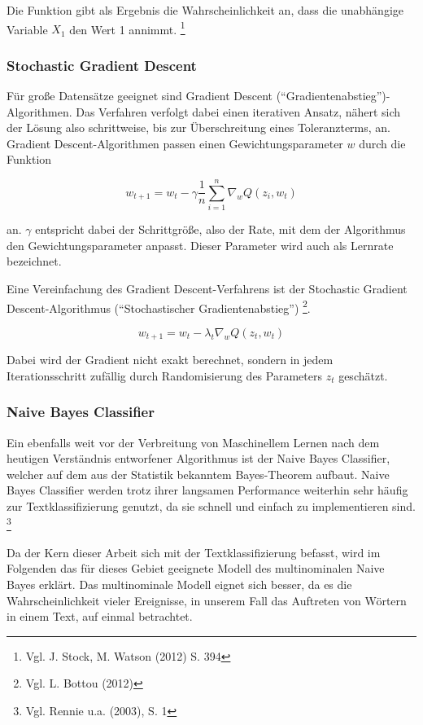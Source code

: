 \documentclass[a4paper,12pt]{article}
\begin{document}
Die Funktion gibt als Ergebnis die Wahrscheinlichkeit an, dass die unabhängige Variable $X_1$ den Wert 1 annimmt. \footnote{Vgl. J. Stock, M. Watson (2012) S. 394}

\subsubsection{Stochastic Gradient Descent}

Für große Datensätze geeignet sind Gradient Descent (``Gradientenabstieg'')-Algorithmen. Das Verfahren verfolgt dabei einen iterativen Ansatz, nähert sich der Lösung also schrittweise, bis zur Überschreitung eines Toleranzterms, an. Gradient Descent-Algorithmen passen einen Gewichtungsparameter $w$ durch die Funktion

\begin{equation}
w_{t+1}=w_t-\gamma\frac{1}{n}\sum_{i=1}^n\nabla_wQ(z_i, w_t)
\end{equation}

an. $\gamma$ entspricht dabei der Schrittgröße, also der Rate, mit dem der Algorithmus den Gewichtungsparameter anpasst. Dieser Parameter wird auch als Lernrate bezeichnet. 

Eine Vereinfachung des Gradient Descent-Verfahrens ist der Stochastic Gradient Descent-Algorithmus (``Stochastischer Gradientenabstieg'') \footnote{Vgl. L. Bottou (2012)}.

\begin{equation}
w_{t+1}=w_t-\lambda_t\nabla_wQ(z_t,w_t)
\end{equation}

Dabei wird der Gradient nicht exakt berechnet, sondern in jedem Iterationsschritt zufällig durch Randomisierung des Parameters $z_t$ geschätzt. 


\subsubsection{Naive Bayes Classifier}

Ein ebenfalls weit vor der Verbreitung von Maschinellem Lernen nach dem heutigen Verständnis entworfener Algorithmus ist der Naive Bayes Classifier, welcher auf dem aus der Statistik bekanntem Bayes-Theorem aufbaut. Naive Bayes Classifier werden trotz ihrer langsamen Performance weiterhin sehr häufig zur Textklassifizierung genutzt, da sie schnell und einfach zu implementieren sind. \footnote{Vgl. Rennie u.a. (2003), S. 1}

Da der Kern dieser Arbeit sich mit der Textklassifizierung befasst, wird im Folgenden das für dieses Gebiet geeignete Modell des multinominalen Naive Bayes erklärt. Das multinominale Modell eignet sich besser, da es die Wahrscheinlichkeit vieler Ereignisse, in unserem Fall das Auftreten von Wörtern in einem Text, auf einmal betrachtet. 
\end{document}
